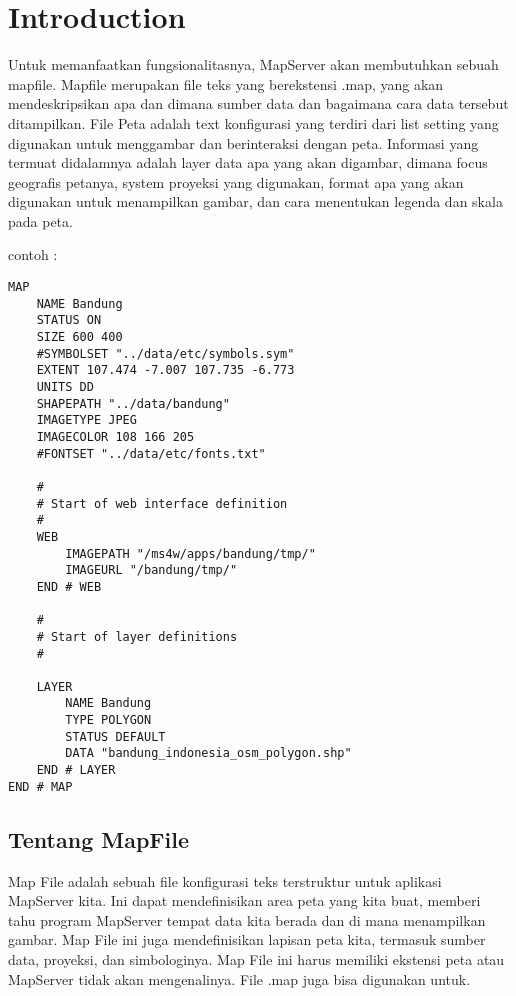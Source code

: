 
\section{Introduction}

Untuk memanfaatkan fungsionalitasnya, MapServer akan membutuhkan sebuah mapfile. Mapfile merupakan file teks yang berekstensi .map,
yang akan mendeskripsikan apa dan dimana sumber data dan bagaimana cara data tersebut ditampilkan. 
File Peta adalah text konfigurasi yang terdiri dari list setting yang digunakan untuk menggambar dan berinteraksi dengan peta. 
Informasi yang termuat didalamnya adalah layer data apa yang akan digambar, dimana focus geografis petanya, 
system proyeksi yang digunakan, format apa yang akan digunakan untuk menampilkan gambar, dan cara menentukan legenda dan skala pada peta.

contoh :
\begin{verbatim}
MAP
    NAME Bandung
    STATUS ON
    SIZE 600 400
    #SYMBOLSET "../data/etc/symbols.sym"
    EXTENT 107.474 -7.007 107.735 -6.773
    UNITS DD
    SHAPEPATH "../data/bandung"
	IMAGETYPE JPEG
    IMAGECOLOR 108 166 205
    #FONTSET "../data/etc/fonts.txt"

    #
    # Start of web interface definition
    #
    WEB
		IMAGEPATH "/ms4w/apps/bandung/tmp/" 
		IMAGEURL "/bandung/tmp/"
    END # WEB

    #
    # Start of layer definitions
    #
	
    LAYER
        NAME Bandung
        TYPE POLYGON
        STATUS DEFAULT
        DATA "bandung_indonesia_osm_polygon.shp"
    END # LAYER
END # MAP
\end{verbatim}

\subsection{Tentang MapFile}
Map File adalah sebuah file konfigurasi teks terstruktur untuk aplikasi MapServer kita. Ini dapat mendefinisikan area peta yang kita buat, 
memberi tahu program MapServer tempat data kita berada dan di mana menampilkan gambar. 
Map File ini juga mendefinisikan lapisan peta kita, termasuk sumber data, proyeksi, dan simbologinya. 
Map File ini harus memiliki ekstensi peta atau MapServer tidak akan mengenalinya.
File .map juga bisa digunakan untuk.

